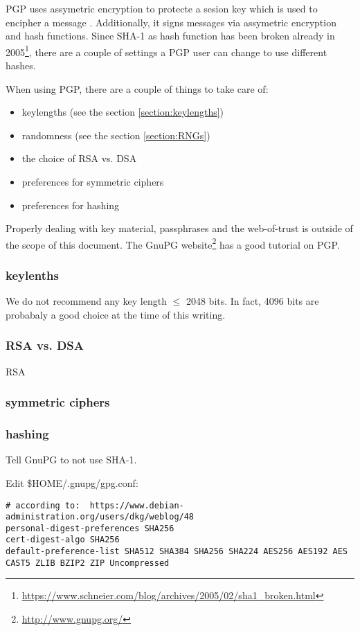 
PGP uses assymetric encryption to protecte a sesion key which is used to encipher a message . Additionally, it signs messages via assymetric encryption and hash functions.
Since SHA-1 as hash function has been broken already in 2005\footnote{\url{https://www.schneier.com/blog/archives/2005/02/sha1\_broken.html}}, there are a couple of settings a PGP user can change to use different hashes.

When using PGP, there are a couple of things to take care of:
\begin{itemize}
\item keylengths (see the section \ref{section:keylengths})
\item randomness (see the section \ref{section:RNGs})
\item the choice of RSA vs. DSA 
\item preferences for symmetric ciphers
\item preferences for hashing
\end{itemize}

Properly dealing with key material, passphrases and the web-of-trust  is outside of the scope of this document. The GnuPG website\footnote{\url{http://www.gnupg.org/}} has a good tutorial on PGP.

\subsubsection{keylenths}
We do not recommend any key length $\le$ 2048 bits. In fact, 4096 bits are probabaly a good choice at the time of this writing.

\subsubsection{RSA vs. DSA}
RSA

\subsubsection{symmetric ciphers}


\subsubsection{hashing}
Tell GnuPG to not use SHA-1.

Edit \$HOME/.gnupg/gpg.conf:

\begin{verbatim}
# according to:  https://www.debian-administration.org/users/dkg/weblog/48
personal-digest-preferences SHA256
cert-digest-algo SHA256
default-preference-list SHA512 SHA384 SHA256 SHA224 AES256 AES192 AES CAST5 ZLIB BZIP2 ZIP Uncompressed
\end{verbatim}


